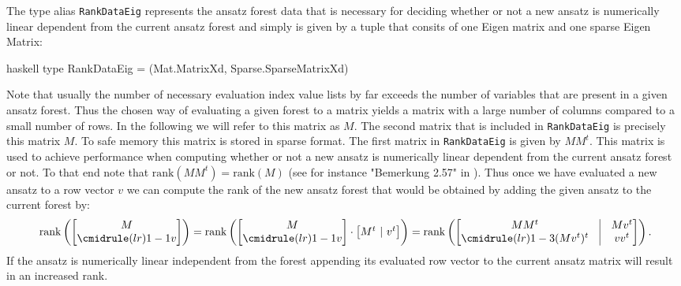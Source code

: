 \documentclass[a4paper,12pt, DIV=14, BCOR=5mm, twoside, headsepline, numbers=noenddot]{scrbook}
\begin{document}
The type alias \texttt{RankDataEig} represents the ansatz forest data that is necessary for deciding whether or not a new ansatz is numerically linear dependent from the current ansatz forest and simply is given by a tuple that consits of one Eigen matrix and one sparse Eigen Matrix:

\begin{center}
\begin{cminted}{haskell}
type RankDataEig = (Mat.MatrixXd, Sparse.SparseMatrixXd)
\end{cminted}
\end{center}

Note that usually the number of necessary evaluation index value lists by far exceeds the number of variables  that are present in a given ansatz forest. Thus the chosen way of evaluating a given forest to a matrix yields a matrix with a large number of columns compared to a small number of rows. In the following we will refer to this matrix as $M$. The second matrix that is included in \texttt{RankDataEig} is precisely this matrix $M$. To safe memory this matrix is stored in sparse format. The first matrix in \texttt{RankDataEig} is given by $M M^t$. This matrix is used to achieve performance when computing whether or not a new ansatz is numerically linear dependent from the current ansatz forest or not. To that end note that $\mathrm{rank}(MM^t) = \mathrm{rank}(M)$ (see for instance "Bemerkung 2.57" in \cite{LAKnab}). Thus once we have evaluated a new ansatz to a row vector $v$ we can compute the rank of the new ansatz forest that would be obtained by adding the given ansatz to the current forest by:
\begin{align}\label{RankDatmat}
    \mathrm{rank}\left (\begin{bmatrix}
        M \\
        \cmidrule(lr){1-1} 
        v
    \end{bmatrix} \right )
    = \mathrm{rank} \left ( \begin{bmatrix}
        M \\
        \cmidrule(lr){1-1}
        v
    \end{bmatrix} \cdot \begin{bmatrix}
        M^t \ \vert \  v^t 
    \end{bmatrix} \right ) = \mathrm{rank} \left (\begin{bmatrix}
        MM^t & \vline & M v^t \\
        \cmidrule(lr){1-3}
        (Mv^t)^t & \vline & vv^t 
    \end{bmatrix}  \right ).
\end{align}
If the ansatz is numerically linear independent from the forest appending its evaluated row vector to the current ansatz matrix will result in an increased rank.
\end{document}
